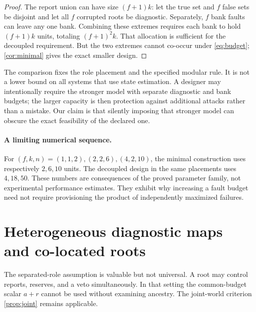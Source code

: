 \begin{proof}
The report union can have size $(f+1)k$: let the true set and $f$ false sets be disjoint and let all $f$ corrupted roots be diagnostic. Separately, $f$ bank faults can leave any one bank. Combining these extremes requires each bank to hold $(f+1)k$ units, totaling $(f+1)^2k$. That allocation is sufficient for the decoupled requirement. But the two extremes cannot co-occur under \cref{eq:budget}; \cref{cor:minimal} gives the exact smaller design.
\end{proof}
The comparison fixes the role placement and the specified modular rule. It is not a lower bound on all systems that use state estimation. A designer may intentionally require the stronger model with separate diagnostic and bank budgets; the larger capacity is then protection against additional attacks rather than a mistake. Our claim is that silently imposing that stronger model can obscure the exact feasibility of the declared one.

\paragraph{A limiting numerical sequence.}
For $(f,k,n)=(1,1,2),(2,2,6),(4,2,10)$, the minimal construction uses respectively $2,6,10$ units. The decoupled design in the same placements uses $4,18,50$. These numbers are consequences of the proved parameter family, not experimental performance estimates. They exhibit why increasing a fault budget need not require provisioning the product of independently maximized failures.

\section{Heterogeneous diagnostic maps and co-located roots}
\label{sec:extensions}
The separated-role assumption is valuable but not universal. A root may control reports, reserves, and a veto simultaneously. In that setting the common-budget scalar $a+r$ cannot be used without examining ancestry. The joint-world criterion \cref{prop:joint} remains applicable.

